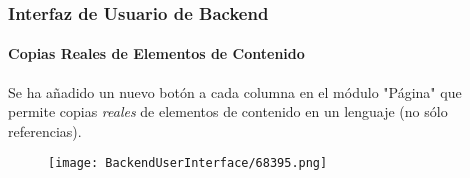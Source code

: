 \begin{frame}[fragile]
	\frametitle{Interfaz de Usuario de Backend}
	\framesubtitle{Copias Reales de Elementos de Contenido}

	Se ha añadido un nuevo botón a cada columna en el módulo "Página" que permite copias \textit{reales} de elementos de contenido
	en un lenguaje (no sólo referencias).

	\begin{figure}
		\texttt{[image: BackendUserInterface/68395.png]}
	\end{figure}

\end{frame}


